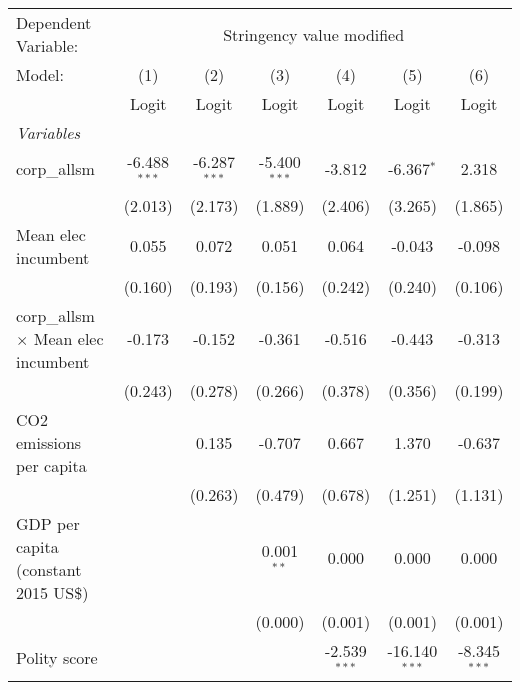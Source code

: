 
\begingroup
\centering
\begin{tabular}{lcccccc}
   \toprule
   Dependent Variable: & \multicolumn{6}{c}{Stringency value modified}\\
   Model:                                     & (1)            & (2)            & (3)            & (4)            & (5)             & (6)\\  
                                              &  Logit         & Logit          & Logit          & Logit          & Logit           & Logit\\  
   \midrule
   \emph{Variables}\\
   corp\_allsm                                & -6.488$^{***}$ & -6.287$^{***}$ & -5.400$^{***}$ & -3.812         & -6.367$^{*}$    & 2.318\\   
                                              & (2.013)        & (2.173)        & (1.889)        & (2.406)        & (3.265)         & (1.865)\\   
   Mean elec incumbent                        & 0.055          & 0.072          & 0.051          & 0.064          & -0.043          & -0.098\\   
                                              & (0.160)        & (0.193)        & (0.156)        & (0.242)        & (0.240)         & (0.106)\\   
   corp\_allsm $\times$ Mean elec incumbent   & -0.173         & -0.152         & -0.361         & -0.516         & -0.443          & -0.313\\   
                                              & (0.243)        & (0.278)        & (0.266)        & (0.378)        & (0.356)         & (0.199)\\   
   CO2 emissions per capita                   &                & 0.135          & -0.707         & 0.667          & 1.370           & -0.637\\   
                                              &                & (0.263)        & (0.479)        & (0.678)        & (1.251)         & (1.131)\\   
   GDP per capita (constant 2015 US\$)        &                &                & 0.001$^{**}$   & 0.000          & 0.000           & 0.000\\   
                                              &                &                & (0.000)        & (0.001)        & (0.001)         & (0.001)\\   
   Polity score                               &                &                &                & -2.539$^{***}$ & -16.140$^{***}$ & -8.345$^{***}$\\   

\end{tabular}
